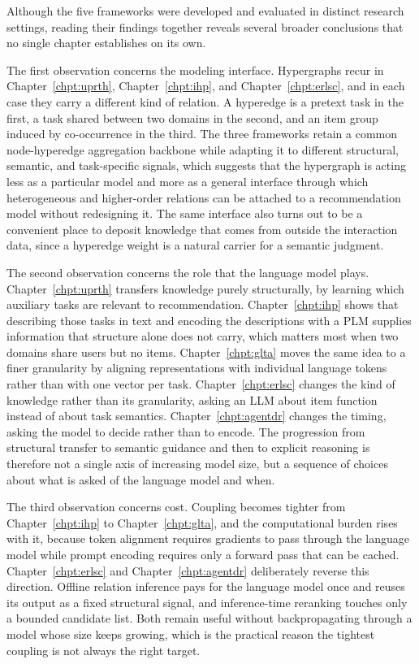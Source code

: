 Although the five frameworks were developed and evaluated in distinct research settings, reading their findings together reveals several broader conclusions that no single chapter establishes on its own.

The first observation concerns the modeling interface. Hypergraphs recur in Chapter~\ref{chpt:uprth}, Chapter~\ref{chpt:ihp}, and Chapter~\ref{chpt:erlsc}, and in each case they carry a different kind of relation. A hyperedge is a pretext task in the first, a task shared between two domains in the second, and an item group induced by co-occurrence in the third. The three frameworks retain a common node-hyperedge aggregation backbone while adapting it to different structural, semantic, and task-specific signals, which suggests that the hypergraph is acting less as a particular model and more as a general interface through which heterogeneous and higher-order relations can be attached to a recommendation model without redesigning it. The same interface also turns out to be a convenient place to deposit knowledge that comes from outside the interaction data, since a hyperedge weight is a natural carrier for a semantic judgment.

The second observation concerns the role that the language model plays. Chapter~\ref{chpt:uprth} transfers knowledge purely structurally, by learning which auxiliary tasks are relevant to recommendation. Chapter~\ref{chpt:ihp} shows that describing those tasks in text and encoding the descriptions with a PLM supplies information that structure alone does not carry, which matters most when two domains share users but no items. Chapter~\ref{chpt:glta} moves the same idea to a finer granularity by aligning representations with individual language tokens rather than with one vector per task. Chapter~\ref{chpt:erlsc} changes the kind of knowledge rather than its granularity, asking an LLM about item function instead of about task semantics. Chapter~\ref{chpt:agentdr} changes the timing, asking the model to decide rather than to encode. The progression from structural transfer to semantic guidance and then to explicit reasoning is therefore not a single axis of increasing model size, but a sequence of choices about what is asked of the language model and when.

The third observation concerns cost. Coupling becomes tighter from Chapter~\ref{chpt:ihp} to Chapter~\ref{chpt:glta}, and the computational burden rises with it, because token alignment requires gradients to pass through the language model while prompt encoding requires only a forward pass that can be cached. Chapter~\ref{chpt:erlsc} and Chapter~\ref{chpt:agentdr} deliberately reverse this direction. Offline relation inference pays for the language model once and reuses its output as a fixed structural signal, and inference-time reranking touches only a bounded candidate list. Both remain useful without backpropagating through a model whose size keeps growing, which is the practical reason the tightest coupling is not always the right target.

